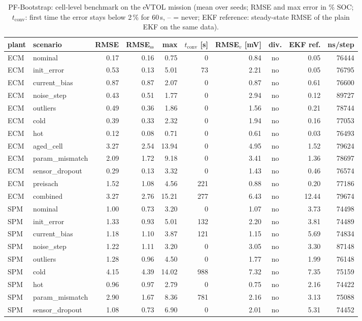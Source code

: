 \begin{table}[H]\centering\footnotesize\setlength{\tabcolsep}{4pt}
\caption{PF-Bootstrap: cell-level benchmark on the eVTOL mission (mean over seeds; RMSE and max error in \% SOC; $t_\mathrm{conv}$: first time the error stays below 2\,\% for 60\,s, -- = never; EKF reference: steady-state RMSE of the plain EKF on the same data).}\label{tab:cell_PFBootstrap}
\begin{tabular}{llrrrrrcrr}\toprule
plant & scenario & RMSE & RMSE$_\mathrm{ss}$ & max & $t_\mathrm{conv}$ [s] & RMSE$_v$ [mV] & div. & EKF ref. & ns/step \\ \midrule
ECM & nominal & 0.17 & 0.16 & 0.75 & 0 & 0.84 & no & 0.05 & 76444 \\
ECM & init\_error & 0.53 & 0.13 & 5.01 & 73 & 2.21 & no & 0.05 & 76795 \\
ECM & current\_bias & 0.87 & 0.87 & 2.07 & 0 & 0.87 & no & 0.61 & 76600 \\
ECM & noise\_step & 0.43 & 0.51 & 1.77 & 0 & 2.94 & no & 0.12 & 89727 \\
ECM & outliers & 0.49 & 0.36 & 1.86 & 0 & 1.56 & no & 0.21 & 78744 \\
ECM & cold & 0.39 & 0.33 & 2.32 & 0 & 1.94 & no & 0.16 & 77053 \\
ECM & hot & 0.12 & 0.08 & 0.71 & 0 & 0.61 & no & 0.03 & 76493 \\
ECM & aged\_cell & 3.27 & 2.54 & 13.94 & 0 & 4.95 & no & 1.52 & 79624 \\
ECM & param\_mismatch & 2.09 & 1.72 & 9.18 & 0 & 3.41 & no & 1.36 & 78697 \\
ECM & sensor\_dropout & 0.29 & 0.13 & 3.32 & 0 & 1.43 & no & 0.46 & 76574 \\
ECM & preisach & 1.52 & 1.08 & 4.56 & 221 & 0.88 & no & 0.20 & 77186 \\
ECM & combined & 3.27 & 2.76 & 15.21 & 277 & 6.43 & no & 12.44 & 79674 \\
\midrule
SPM & nominal & 1.00 & 0.73 & 3.20 & 0 & 1.07 & no & 3.73 & 74498 \\
SPM & init\_error & 1.33 & 0.93 & 5.01 & 132 & 2.20 & no & 3.81 & 74489 \\
SPM & current\_bias & 1.18 & 1.10 & 3.87 & 121 & 1.15 & no & 5.69 & 74834 \\
SPM & noise\_step & 1.22 & 1.11 & 3.20 & 0 & 3.05 & no & 3.30 & 87148 \\
SPM & outliers & 1.28 & 0.96 & 4.50 & 0 & 1.77 & no & 1.99 & 76148 \\
SPM & cold & 4.15 & 4.39 & 14.02 & 988 & 7.32 & no & 7.35 & 75159 \\
SPM & hot & 0.96 & 0.97 & 2.79 & 0 & 0.75 & no & 2.16 & 74422 \\
SPM & param\_mismatch & 2.90 & 1.67 & 8.36 & 781 & 2.16 & no & 3.13 & 75088 \\
SPM & sensor\_dropout & 1.08 & 0.73 & 6.90 & 0 & 2.01 & no & 5.31 & 74452 \\
\bottomrule\end{tabular}\end{table}
